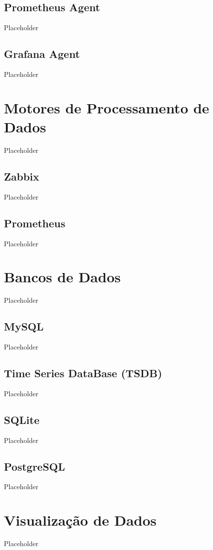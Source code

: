 \subsection{Prometheus Agent}
Placeholder

\subsection{Grafana Agent}
Placeholder

\section{Motores de Processamento de Dados}
Placeholder

\subsection{Zabbix}
Placeholder

\subsection{Prometheus}
Placeholder

\section{Bancos de Dados}
Placeholder

\subsection{MySQL}
Placeholder

\subsection{Time Series DataBase (TSDB)}
Placeholder

\subsection{SQLite}
Placeholder

\subsection{PostgreSQL}
Placeholder

\section{Visualização de Dados}
Placeholder

